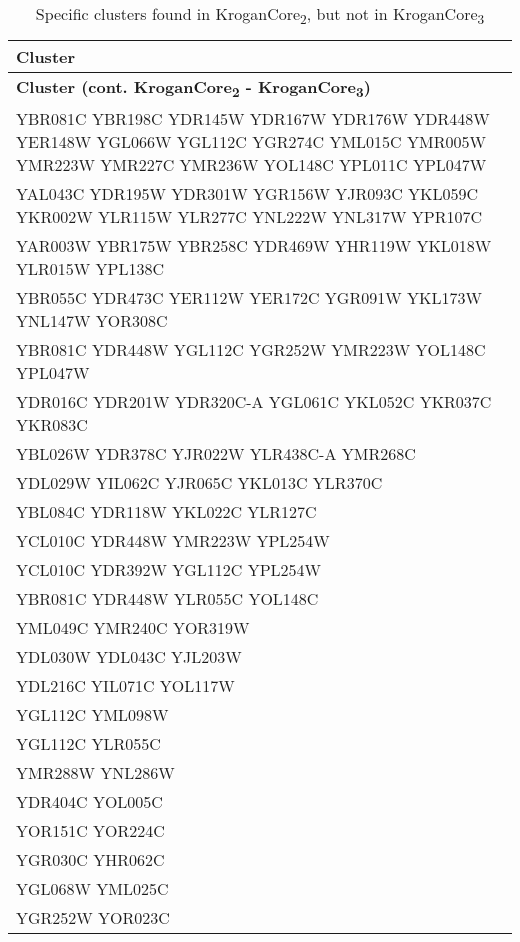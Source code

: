 \setlength{\extrarowheight}{2pt}
\renewcommand{\arraystretch}{1.2}
\begin{longtable}{| m{27em} |}
\caption{Specific clusters found in KroganCore\textsubscript{2}, but not in KroganCore\textsubscript{3}} \\
\hline
\textbf{Cluster} \\
\hline
\endfirsthead
\hline
\textbf{Cluster (cont. KroganCore\textsubscript{2} - KroganCore\textsubscript{3})} \\
\hline
\endhead
\hline
\endfoot
\hline
\endlastfoot
YBR081C YBR198C YDR145W YDR167W YDR176W YDR448W YER148W YGL066W YGL112C YGR274C YML015C YMR005W YMR223W YMR227C YMR236W YOL148C YPL011C YPL047W \\
\hline
YAL043C YDR195W YDR301W YGR156W YJR093C YKL059C YKR002W YLR115W YLR277C YNL222W YNL317W YPR107C \\
\hline
YAR003W YBR175W YBR258C YDR469W YHR119W YKL018W YLR015W YPL138C \\
\hline
YBR055C YDR473C YER112W YER172C YGR091W YKL173W YNL147W YOR308C \\
\hline
YBR081C YDR448W YGL112C YGR252W YMR223W YOL148C YPL047W \\
\hline
YDR016C YDR201W YDR320C-A YGL061C YKL052C YKR037C YKR083C \\
\hline
YBL026W YDR378C YJR022W YLR438C-A YMR268C \\
\hline
YDL029W YIL062C YJR065C YKL013C YLR370C \\
\hline
YBL084C YDR118W YKL022C YLR127C \\
\hline
YCL010C YDR448W YMR223W YPL254W \\
\hline
YCL010C YDR392W YGL112C YPL254W \\
\hline
YBR081C YDR448W YLR055C YOL148C \\
\hline
YML049C YMR240C YOR319W \\
\hline
YDL030W YDL043C YJL203W \\
\hline
YDL216C YIL071C YOL117W \\
\hline
YGL112C YML098W \\
\hline
YGL112C YLR055C \\
\hline
YMR288W YNL286W \\
\hline
YDR404C YOL005C \\
\hline
YOR151C YOR224C \\
\hline
YGR030C YHR062C \\
\hline
YGL068W YML025C \\
\hline
YGR252W YOR023C \\
\hline
\end{longtable}